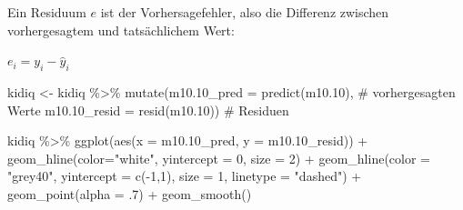 \documentclass[
  a4paper,
  DIV=11]{scrreprt}
\newenvironment{Shaded}{\begin{snugshade}}{\end{snugshade}}
\newcommand{\AttributeTok}[1]{\textcolor[rgb]{0.40,0.45,0.13}{#1}}
\newcommand{\CommentTok}[1]{\textcolor[rgb]{0.37,0.37,0.37}{#1}}
\newcommand{\DecValTok}[1]{\textcolor[rgb]{0.68,0.00,0.00}{#1}}
\newcommand{\FloatTok}[1]{\textcolor[rgb]{0.68,0.00,0.00}{#1}}
\newcommand{\FunctionTok}[1]{\textcolor[rgb]{0.28,0.35,0.67}{#1}}
\newcommand{\NormalTok}[1]{\textcolor[rgb]{0.00,0.23,0.31}{#1}}
\newcommand{\OtherTok}[1]{\textcolor[rgb]{0.00,0.23,0.31}{#1}}
\newcommand{\SpecialCharTok}[1]{\textcolor[rgb]{0.37,0.37,0.37}{#1}}
\newcommand{\StringTok}[1]{\textcolor[rgb]{0.13,0.47,0.30}{#1}}
\theoremstyle{definition}
\theoremstyle{remark}
\begin{document}
Ein Residuum \(e\) ist der Vorhersagefehler, also die Differenz zwischen
vorhergesagtem und tatsächlichem Wert:

\(e_i = y_i - \hat{y}_i\)

\begin{Shaded}
\begin{Highlighting}[]
\NormalTok{kidiq }\OtherTok{\textless{}{-}}
\NormalTok{  kidiq }\SpecialCharTok{\%\textgreater{}\%} 
  \FunctionTok{mutate}\NormalTok{(}\AttributeTok{m10.10\_pred =} \FunctionTok{predict}\NormalTok{(m10}\FloatTok{.10}\NormalTok{),  }\CommentTok{\# vorhergesagten Werte}
         \AttributeTok{m10.10\_resid =} \FunctionTok{resid}\NormalTok{(m10}\FloatTok{.10}\NormalTok{))  }\CommentTok{\# Residuen}
\end{Highlighting}
\end{Shaded}

\begin{Shaded}
\begin{Highlighting}[]
\NormalTok{kidiq }\SpecialCharTok{\%\textgreater{}\%} 
  \FunctionTok{ggplot}\NormalTok{(}\FunctionTok{aes}\NormalTok{(}\AttributeTok{x =}\NormalTok{ m10}\FloatTok{.10}\NormalTok{\_pred, }\AttributeTok{y =}\NormalTok{ m10}\FloatTok{.10}\NormalTok{\_resid)) }\SpecialCharTok{+}
  \FunctionTok{geom\_hline}\NormalTok{(}\AttributeTok{color=}\StringTok{"white"}\NormalTok{, }\AttributeTok{yintercept =} \DecValTok{0}\NormalTok{, }\AttributeTok{size =} \DecValTok{2}\NormalTok{) }\SpecialCharTok{+}
  \FunctionTok{geom\_hline}\NormalTok{(}\AttributeTok{color =} \StringTok{"grey40"}\NormalTok{, }
             \AttributeTok{yintercept =} \FunctionTok{c}\NormalTok{(}\SpecialCharTok{{-}}\DecValTok{1}\NormalTok{,}\DecValTok{1}\NormalTok{), }
             \AttributeTok{size =} \DecValTok{1}\NormalTok{, }
             \AttributeTok{linetype =} \StringTok{"dashed"}\NormalTok{) }\SpecialCharTok{+}
  \FunctionTok{geom\_point}\NormalTok{(}\AttributeTok{alpha =}\NormalTok{ .}\DecValTok{7}\NormalTok{) }\SpecialCharTok{+}
  \FunctionTok{geom\_smooth}\NormalTok{()}
\end{Highlighting}
\end{Shaded}
\end{document}

